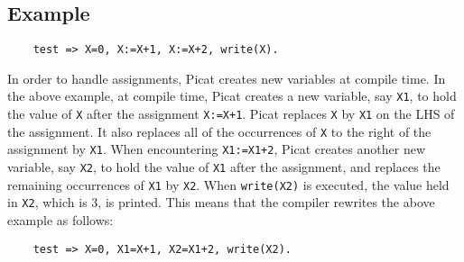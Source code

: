 \subsection*{Example}
\begin{verbatim}
    test => X=0, X:=X+1, X:=X+2, write(X).
\end{verbatim}

In order to handle assignments, Picat creates new variables at compile time.  In the above example, at compile time, Picat creates a new variable, say \texttt{X1}, to hold the value of \texttt{X} after the assignment \verb-X:=X+1-. Picat replaces \texttt{X} by \texttt{X1} on the LHS of the assignment.  It also replaces all of the occurrences of \texttt{X} to the right of the assignment by \texttt{X1}.  When encountering \verb-X1:=X1+2-, Picat creates another new variable, say \texttt{X2}, to hold the value of \texttt{X1} after the assignment, and replaces the remaining occurrences of \texttt{X1} by \texttt{X2}. When \texttt{write(X2)} is executed, the value held in \texttt{X2}, which is 3, is printed.  This means that the compiler rewrites the above example as follows:
\begin{verbatim}
    test => X=0, X1=X+1, X2=X1+2, write(X2).
\end{verbatim}

